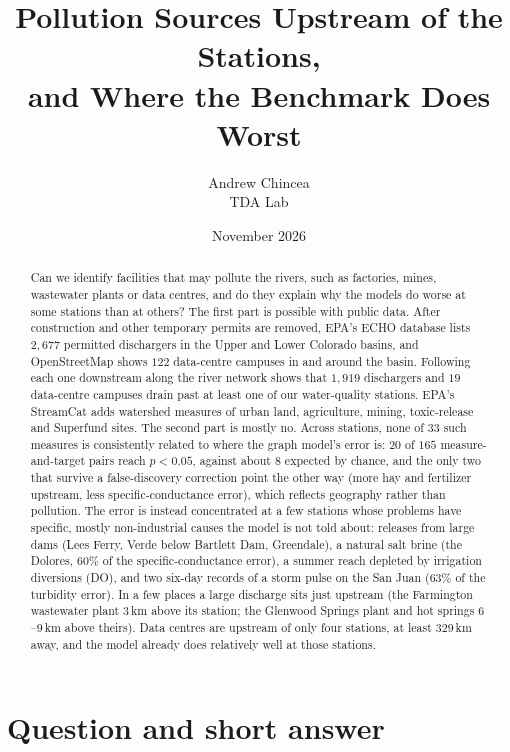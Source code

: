 \documentclass[11pt]{article}
\title{Pollution Sources Upstream of the Stations,\\
       and Where the Benchmark Does Worst}
\author{Andrew Chincea \\ TDA Lab}
\date{November 2026}
\begin{document}
\maketitle

\begin{abstract}
Can we identify facilities that may pollute the rivers, such as factories, mines, wastewater plants
or data centres, and do they explain why the models do worse at some stations than at others? The
first part is possible with public data. After construction and other temporary permits are
removed, EPA's ECHO database lists $2{,}677$ permitted dischargers in the Upper and Lower Colorado
basins, and OpenStreetMap shows $122$ data-centre campuses in and
around the basin. Following each one downstream along the river network shows that $1{,}919$
dischargers and $19$ data-centre campuses drain past at least one of our water-quality stations.
EPA's StreamCat adds watershed measures of urban land, agriculture, mining, toxic-release and
Superfund sites. The second part is mostly no. Across stations, none of 33 such measures is
consistently related to where the graph model's error is: $20$ of $165$ measure-and-target pairs
reach $p<0.05$, against about $8$ expected by chance, and the only two that survive a
false-discovery correction point the other way (more hay and fertilizer upstream, less
specific-conductance error), which reflects geography rather than pollution. The error is instead
concentrated at a few stations whose problems have specific, mostly non-industrial causes the
model is not told about: releases from large dams (Lees Ferry, Verde below Bartlett Dam,
Greendale), a natural salt brine (the Dolores, $60\%$ of the specific-conductance error), a summer
reach depleted by irrigation diversions (DO), and two six-day records of a storm pulse on the San
Juan ($63\%$ of the turbidity error). In a few places a large discharge sits just upstream (the
Farmington wastewater plant $3$\,km above its station; the Glenwood Springs plant and hot springs
$6$--$9$\,km above theirs). Data centres are upstream of only four stations, at least $329$\,km
away, and the model already does relatively well at those stations.
\end{abstract}

\section{Question and short answer}
\end{document}
